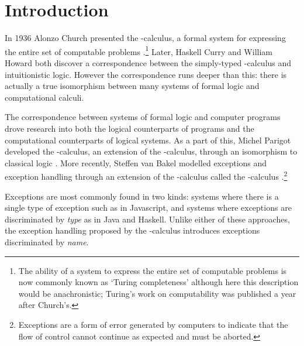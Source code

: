\chapter{Introduction}

In 1936 Alonzo Church presented the \lam-calculus, a formal system for expressing the entire set of computable problems \cite{Church36}.\footnote{
  The ability of a system to express the entire set of computable problems is now commonly known as `Turing completeness' although here this description would be anachronistic; 
  Turing's work on computability was published a year after Church's.
}
Later, Haskell Curry and William Howard both discover a correspondence between the simply-typed \lam-calculus and intuitionistic logic. 
However the correspondence runs deeper than this: there is actually a true isomorphism between many systems of formal logic and computational calculi. 

The correspondence between systems of formal logic and computer programs drove research into both the logical counterparts of programs and the computational counterparts of logical systems.
As a part of this, Michel Parigot developed the \lmu-calculus, an extension of the \lam-calculus, 
through an isomorphism to classical logic \cite{Parigot92}.
More recently, Steffen van Bakel modelled exceptions and exception handling through an extension of the \lam-calculus called the \ltry-calculus \cite{Bakel15}.\footnote{
  Exceptions are a form of error generated by computers to indicate that the flow of control cannot continue as expected and must be aborted. 
}

Exceptions are most commonly found in two kinds: 
  systems where there is a single type of exception such as in Javascript, 
  and systems where exceptions are discriminated by \emph{type} as in Java and Haskell. 
Unlike either of these approaches, 
the exception handling proposed by the \ltry-calculus introduces exceptions discriminated by \emph{name}.

